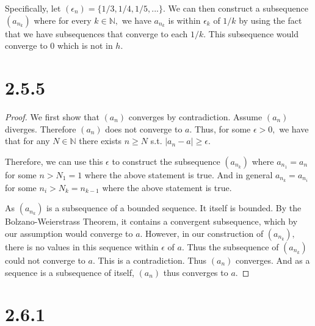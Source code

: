 \documentclass[10pt]{article}
\begin{document}
Specifically, let $(\epsilon_n) = \{1/3,1/4,1/5,...\}.$ 
We can then construct a subsequence $(a_{n_k})$ where for every $k\in\mathbb{N},$ we have $a_{n_k}$ is within $\epsilon_{k}$ of $1/k$ by using the fact that we have subsequences that converge to each $1/k.$ This subsequence would converge to $0$ which is not in $h.$

\section*{2.5.5}

\begin{proof}

    We first show that $(a_n)$ converges by contradiction. Assume $(a_n)$ diverges. Therefore $(a_n)$ does not converge to $a.$ Thus, for some $\epsilon > 0,$ we have that for any $N\in\mathbb{N}$ there exists $n\ge N$ s.t. $|a_n-a|\ge\epsilon.$

    Therefore, we can use this $\epsilon$ to construct the subsequence $(a_{n_k})$ where
    $a_{n_1}=a_n$
    for some $n>N_1=1$ where the above statement is true.
    And in general
    $a_{n_k}=a_{n_i}$
    for some $n_i>N_k=n_{k-1}$ where the above statement is true.


    As $(a_{n_k})$ is a subsequence of a bounded sequence. It itself is bounded. By the Bolzano-Weierstrass Theorem, it contains a convergent subsequence, which by our assumption would converge to $a.$  However, in our construction of $(a_{n_k}),$ there is no values in this sequence within $\epsilon$ of $a.$  Thus the subsequence of $(a_{n_k})$ could not converge to $a.$ This is a contradiction.
    Thus $(a_n)$ converges. And as a sequence is a subsequence of itself, $(a_n)$ thus converges to $a.$
\end{proof}

\section*{2.6.1}
\end{document}
